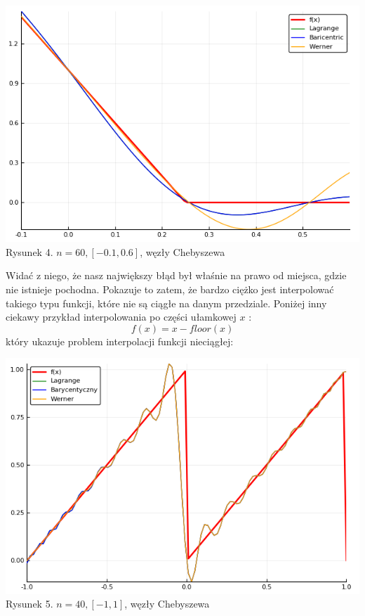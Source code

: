 \documentclass[11pt, wide]{article}
\begin{document}
\begin{center}
    \includegraphics[scale=0.4]{wykres4}\\
    Rysunek 4. $n = 60, [-0.1,0.6]$, węzły Chebyszewa
\end{center}
Widać z niego, że nasz największy błąd był właśnie na prawo od miejsca, gdzie nie istnieje pochodna. 
Pokazuje to zatem, że bardzo ciężko jest interpolować takiego typu funkcji, które nie są ciągłe na danym przedziale.
Poniżej inny ciekawy przykład interpolowania po części ułamkowej $x$ : 
$$
    f(x) = x - floor(x)
$$
który ukazuje problem interpolacji funkcji nieciągłej:
\begin{center}
    \includegraphics[scale=0.4]{wykres5}\\
    Rysunek 5. $n = 40, [-1,1]$, węzły Chebyszewa
\end{center}
\\
\end{document}
